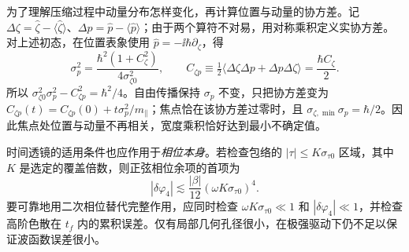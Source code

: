 为了理解压缩过程中动量分布怎样变化，再计算位置与动量的协方差。记 $\Delta\zeta=\hat\zeta-\langle\hat\zeta\rangle$、$\Delta p=\hat p-\langle\hat p\rangle$；由于两个算符不对易，用对称乘积定义实协方差。对上述初态，在位置表象使用 $\hat p=-\ii\hbar\partial_\zeta$，得
\begin{equation*}
 \sigma_p^2=\frac{\hbar^2(1+C_\zeta^2)}{4\sigma_{\zeta0}^2},\qquad
 C_{\zeta p}\equiv\tfrac12\langle\Delta\zeta\Delta p+\Delta p\Delta\zeta\rangle
 =\frac{\hbar C_\zeta}{2}.
\end{equation*}
所以 $\sigma_{\zeta0}^2\sigma_p^2-C_{\zeta p}^2=\hbar^2/4$。自由传播保持 $\sigma_p$ 不变，只把协方差变为 $C_{\zeta p}(t)=C_{\zeta p}(0)+t\sigma_p^2/m_\parallel$；焦点恰在该协方差过零时，且 $\sigma_{\zeta,\min}\sigma_p=\hbar/2$。因此焦点处位置与动量不再相关，宽度乘积恰好达到最小不确定值。

时间透镜的适用条件也应作用于\emph{相位本身}。若检查包络的 $|\tau|\le K\sigma_{\tau0}$ 区域，其中 $K$ 是选定的覆盖倍数，则正弦相位余项的首项为
\begin{equation*}
 |\delta\varphi_4|\lesssim\frac{|\beta|}{12}
 (\omega K\sigma_{\tau0})^4.
\end{equation*}
要可靠地用二次相位替代完整作用，应同时检查 $\omega K\sigma_{\tau0}\ll1$ 和 $|\delta\varphi_4|\ll1$，并检查高阶色散在 $t_f$ 内的累积误差。仅有局部几何孔径很小，在极强驱动下仍不足以保证波函数误差很小。

